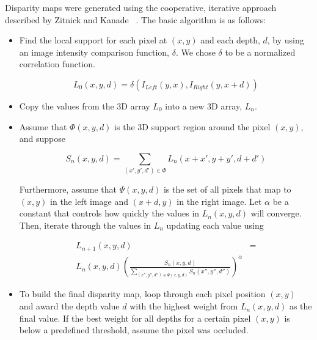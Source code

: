 \documentclass[twocolumn]{article}
\begin{document}
Disparity maps were generated using the cooperative, iterative approach described by Zitnick and Kanade ~\cite{stereo:zitKan}.
The basic algorithm is as follows:
\begin{itemize}
\item Find the local support for each pixel at $(x,y)$ and each depth, $d$, by using an image intensity comparison function, $\delta$.
We chose $\delta$ to be a normalized correlation function.

\begin{equation}
L_0(x,y,d) = \delta(I_{Left}(y,x),I_{Right}(y,x+d))
\end{equation}

\item Copy the values from the 3D array $L_0$ into a new 3D array, $L_n$.

\item Assume that $\Phi(x,y,d)$ is the 3D support region around the pixel $(x,y)$, and suppose

\begin{equation}
S_n(x,y,d) = \sum_{(x',y',d') \in \Phi} L_n (x+x', y+y', d+d')
\end{equation}

Furthermore, assume that $\Psi(x,y,d)$ is the set of all pixels that map to $(x,y)$ in the left image and $(x+d,y)$ in the right image. 
Let $\alpha$ be a constant that controls how quickly the values in $L_n(x,y,d)$ will converge. Then, iterate through the values in $L_n$ updating each value using
 
\begin{align}
L_{n+1}(x,y,d) &= \\ 
L_n(x,y,d)\left(\frac{S_n(x,y,d)}{\sum\limits_{(x'',y'',d'') \in \Psi(x,y,d)} S_n(x'',y'',d'')} \right)^\alpha 
\end{align}

\item To build the final disparity map, loop through each pixel position $(x,y)$ and award the depth value $d$ with the highest weight from $L_n(x,y,d)$ as the final value.
If the best weight for all depths for a certain pixel $(x,y)$ is below a predefined threshold, assume the pixel was occluded.
\end{itemize}

\end{document}
